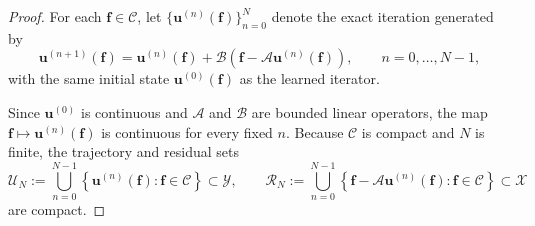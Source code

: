 \documentclass[preprint,numbers,sort&compress]{elsarticle}
\begin{document}
			\begin{proof}
				For each $\boldsymbol f\in\mathcal C$, let
				$\{\boldsymbol u^{(n)}(\boldsymbol f)\}_{n=0}^{N}$ denote the exact
				iteration generated by
				\[
				\boldsymbol u^{(n+1)}(\boldsymbol f)
				=
				\boldsymbol u^{(n)}(\boldsymbol f)
				+
				\mathcal B
				\left(
				\boldsymbol f
				-
				\mathcal A\boldsymbol u^{(n)}(\boldsymbol f)
				\right),
				\qquad
				n=0,\ldots,N-1,
				\]
				with the same initial state
				$\boldsymbol u^{(0)}(\boldsymbol f)$ as the learned iterator.
				
				Since $\boldsymbol u^{(0)}$ is continuous and $\mathcal A$ and
				$\mathcal B$ are bounded linear operators, the map $\boldsymbol f
				\longmapsto\boldsymbol u^{(n)}(\boldsymbol f)$ is continuous for every fixed $n$. Because $\mathcal C$ is compact and
				$N$ is finite, the trajectory and residual sets
				\[
				\mathcal U_N
				:=
				\bigcup_{n=0}^{N-1}
				\left\{
				\boldsymbol u^{(n)}(\boldsymbol f):
				\boldsymbol f\in\mathcal C
				\right\}
				\subset\mathcal Y, \qquad
				\mathcal R_N
				:=
				\bigcup_{n=0}^{N-1}
				\left\{
				\boldsymbol f
				-
				\mathcal A\boldsymbol u^{(n)}(\boldsymbol f):
				\boldsymbol f\in\mathcal C
				\right\}
				\subset\mathcal X
				\]
				are compact. 
				

\end{proof}
\end{document}
